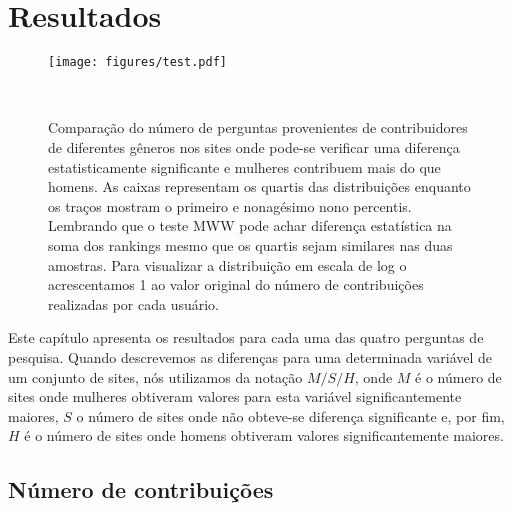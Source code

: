 \chapter{Resultados}

\begin{figure}
  \raggedleft
  \texttt{[image: figures/test.pdf]}
  \caption[Comparação do número de perguntas]{Comparação do número de perguntas provenientes de contribuidores de diferentes gêneros nos sites onde pode-se verificar uma diferença estatisticamente significante e mulheres contribuem mais do que homens. As caixas representam os quartis das distribuições enquanto os traços mostram o primeiro e nonagésimo nono percentis. Lembrando que o teste MWW pode achar diferença estatística na soma dos rankings mesmo que os quartis sejam similares nas duas amostras. Para visualizar a distribuição em escala de log o acrescentamos 1 ao valor original do número de contribuições realizadas por cada usuário. }~\label{figure:questions}
\end{figure}


Este capítulo apresenta os resultados para cada uma das quatro perguntas de pesquisa. Quando descrevemos as diferenças para uma determinada variável de um conjunto de sites, nós utilizamos da notação $M/S/H$, onde $M$ é o número de sites onde mulheres obtiveram valores para esta variável significantemente maiores, $S$ o número de sites onde não obteve-se diferença significante e, por fim, $H$ é o número de sites onde homens obtiveram valores significantemente maiores.

\section{Número de contribuições}


